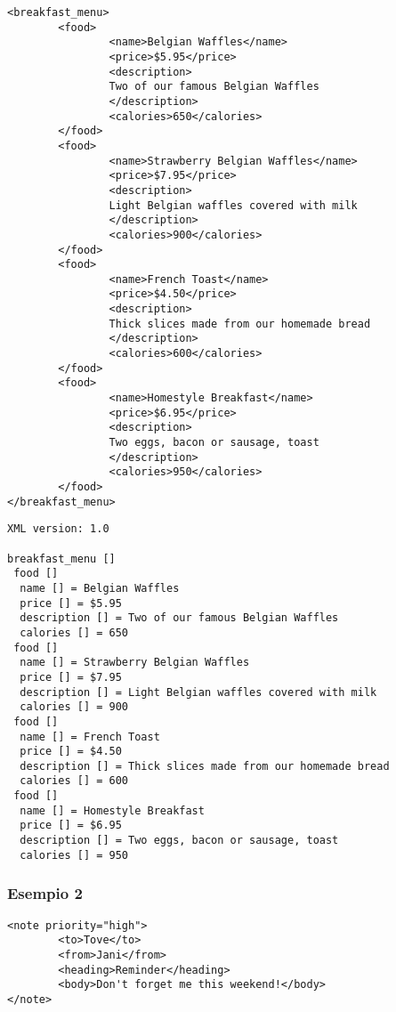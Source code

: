 \documentclass[italian,a4paper]{article}
\begin{document}
\begin{mdframed}[frametitle=Input]
\begin{verbatim}
<breakfast_menu>
        <food>
                <name>Belgian Waffles</name>
                <price>$5.95</price>
                <description>
                Two of our famous Belgian Waffles
                </description>
                <calories>650</calories>
        </food>
        <food>
                <name>Strawberry Belgian Waffles</name>
                <price>$7.95</price>
                <description>
                Light Belgian waffles covered with milk
                </description>
                <calories>900</calories>
        </food>
        <food>
                <name>French Toast</name>
                <price>$4.50</price>
                <description>
                Thick slices made from our homemade bread
                </description>
                <calories>600</calories>
        </food>
        <food>
                <name>Homestyle Breakfast</name>
                <price>$6.95</price>
                <description>
                Two eggs, bacon or sausage, toast
                </description>
                <calories>950</calories>
        </food>
</breakfast_menu>
\end{verbatim}
\end{mdframed}

\begin{mdframed}[frametitle=Output]
\begin{verbatim}
XML version: 1.0

breakfast_menu []
 food []
  name [] = Belgian Waffles
  price [] = $5.95
  description [] = Two of our famous Belgian Waffles
  calories [] = 650
 food []
  name [] = Strawberry Belgian Waffles
  price [] = $7.95
  description [] = Light Belgian waffles covered with milk
  calories [] = 900
 food []
  name [] = French Toast
  price [] = $4.50
  description [] = Thick slices made from our homemade bread
  calories [] = 600
 food []
  name [] = Homestyle Breakfast
  price [] = $6.95
  description [] = Two eggs, bacon or sausage, toast
  calories [] = 950
\end{verbatim}
\end{mdframed}

\subsubsection{Esempio 2}

\begin{mdframed}[frametitle=Input]
\begin{verbatim}
<note priority="high">
        <to>Tove</to>
        <from>Jani</from>
        <heading>Reminder</heading>
        <body>Don't forget me this weekend!</body>
</note>
\end{verbatim}
\end{mdframed}
\end{document}
